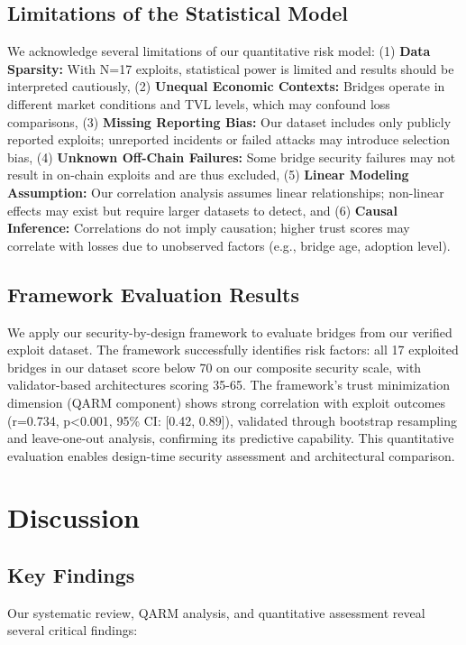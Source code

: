 \documentclass[runningheads]{llncs}
\begin{document}
\subsection{Limitations of the Statistical Model}
We acknowledge several limitations of our quantitative risk model: (1) \textbf{Data Sparsity:} With N=17 exploits, statistical power is limited and results should be interpreted cautiously, (2) \textbf{Unequal Economic Contexts:} Bridges operate in different market conditions and TVL levels, which may confound loss comparisons, (3) \textbf{Missing Reporting Bias:} Our dataset includes only publicly reported exploits; unreported incidents or failed attacks may introduce selection bias, (4) \textbf{Unknown Off-Chain Failures:} Some bridge security failures may not result in on-chain exploits and are thus excluded, (5) \textbf{Linear Modeling Assumption:} Our correlation analysis assumes linear relationships; non-linear effects may exist but require larger datasets to detect, and (6) \textbf{Causal Inference:} Correlations do not imply causation; higher trust scores may correlate with losses due to unobserved factors (e.g., bridge age, adoption level).

\subsection{Framework Evaluation Results}
We apply our security-by-design framework to evaluate bridges from our verified exploit dataset. The framework successfully identifies risk factors: all 17 exploited bridges in our dataset score below 70 on our composite security scale, with validator-based architectures scoring 35-65. The framework's trust minimization dimension (QARM component) shows strong correlation with exploit outcomes (r=0.734, p<0.001, 95\% CI: [0.42, 0.89]), validated through bootstrap resampling and leave-one-out analysis, confirming its predictive capability. This quantitative evaluation enables design-time security assessment and architectural comparison.

\vspace{-0.3cm}
\section{Discussion}
\label{sec:discussion}

\subsection{Key Findings}
Our systematic review, QARM analysis, and quantitative assessment reveal several critical findings:
\end{document}
